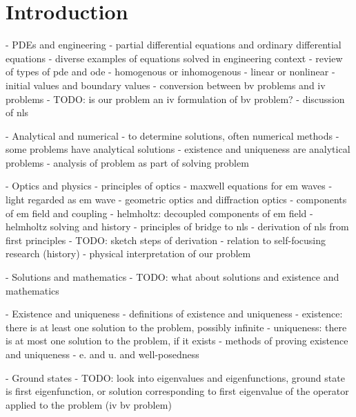 \section{Introduction}

- PDEs and engineering
  - partial differential equations and ordinary differential equations
  - diverse examples of equations solved in engineering context
  - review of types of pde and ode
    - homogenous or inhomogenous
    - linear or nonlinear
    - initial values and boundary values
      - conversion between bv problems and iv problems
      - TODO: is our problem an iv formulation of bv problem?
  - discussion of nls

- Analytical and numerical
  - to determine solutions, often numerical methods
  - some problems have analytical solutions
  - existence and uniqueness are analytical problems
  - analysis of problem as part of solving problem

- Optics and physics
  - principles of optics
    - maxwell equations for em waves
    - light regarded as em wave
    - geometric optics and diffraction optics
    - components of em field and coupling
    - helmholtz: decoupled components of em field
    - helmholtz solving and history
    - principles of bridge to nls
  - derivation of nls from first principles
    - TODO: sketch steps of derivation
  - relation to self-focusing research (history)
  - physical interpretation of our problem

- Solutions and mathematics
  - TODO: what about solutions and existence and mathematics

- Existence and uniqueness
  - definitions of existence and uniqueness
    - existence: there is at least one solution to the problem, possibly infinite
    - uniqueness: there is at most one solution to the problem, if it exists
  - methods of proving existence and uniqueness
  - e. and u. and well-posedness

- Ground states
  - TODO: look into eigenvalues and eigenfunctions, ground state is first eigenfunction, or solution corresponding to first eigenvalue of the operator applied to the problem (iv bv problem)


